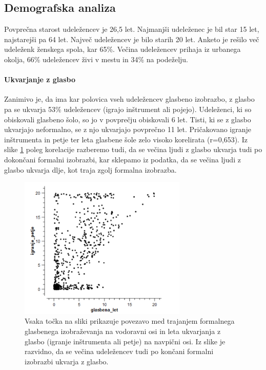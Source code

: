 \documentclass[a4paper, 12pt]{book}
\begin{document}
{\subsection{Demografska analiza}

Povprečna starost udeležencev je 26,5 let. Najmanjši udeleženec je bil star 15 let, najstarejši pa 64 let. Največ udeležencev je bilo starih 20 let. Anketo je rešilo več udeleženk ženskega spola, kar 65\%. Večina udeležencev prihaja iz urbanega okolja, 66\% udeležencev živi v mestu in 34\% na podeželju.

\paragraph{Ukvarjanje z glasbo}

Zanimivo je, da ima kar polovica vseh udeležencev glasbeno izobrazbo, z glasbo pa se ukvarja 53\% udeležencev (igrajo inštrument ali pojejo). Udeleženci, ki so obiskovali glasbeno šolo, so jo v povprečju obiskovali 6 let. Tisti, ki se z glasbo ukvarjajo neformalno, se z njo ukvarjajo povprečno 11 let. Pričakovano igranje inštrumenta in petje ter leta glasbene šole zelo visoko korelirata (r=0,653). Iz slike \ref{ukvarjanjeglizobrazba} poleg korelacije razberemo tudi, da se večina ljudi z glasbo ukvarja tudi po dokončani formalni izobrazbi, kar sklepamo iz podatka, da se večina ljudi z glasbo ukvarja dlje, kot traja zgolj formalna izobrazba. 

\begin{figure}[hbt]
\centering
\includegraphics[width=8cm]{images/izobrazba_ukvarjanje.png}

\caption{Vsaka točka na sliki prikazuje povezavo med trajanjem formalnega glasbenega izobraževanja na vodoravni osi in leta ukvarjanja z glasbo (igranje inštrumenta ali petje) na navpični osi.  Iz slike je razvidno, da se večina udeležencev tudi po končani formalni izobrazbi ukvarja z glasbo.  }
\label{ukvarjanjeglizobrazba}
\end{figure}

}
\end{document}
